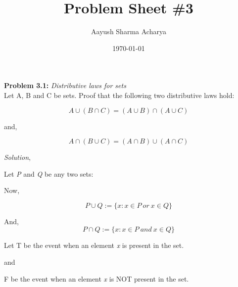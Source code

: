 \documentclass[a4paper,12pt]{article}
\title{Problem Sheet \#3}
\author{Aayush Sharma Acharya}
\date{\today}
\begin{document}
    \maketitle
    \textbf{Problem 3.1: } \textit{Distributive laws for sets}\\

    Let A, B and C be sets. Proof that the following two distributive laws hold:

    $$ \textit{A} \cup (\textit{B} \cap \textit{C}) = ( \textit{A} \cup \textit{B} ) \cap ( \textit{A} \cup \textit{C} )$$
    \begin{center}
        and,
    \end{center}
    $$ \textit{A} \cap (\textit{B} \cup \textit{C}) = ( \textit{A} \cap \textit{B} ) \cup ( \textit{A} \cap \textit{C} )$$

    \textit{Solution},

    \indent Let \textit{P} and \textit{Q} be any two sets:

    Now,

    $$\textit{P} \cup \textit{Q} := \{ x: x \in \textit{P} \  or\  \textit{x} \in \textit{Q} \}$$

    And,
    $$\textit{P} \cap \textit{Q} := \{ x: x \in \textit{P} \ and\  \textit{x} \in \textit{Q} \}$$

    Let T be the event when an element \textit{x} is present in the set.
    \begin{center}
        and
    \end{center}

    F be the event when an element \textit{x} is NOT present in the set.
\end{document}
